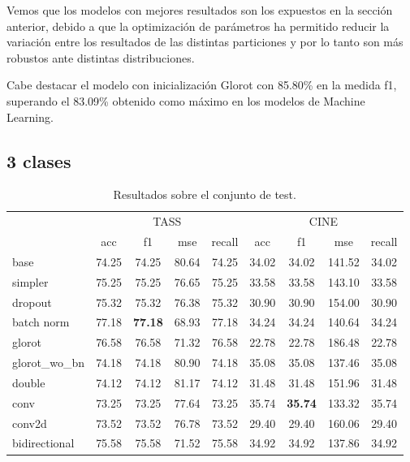 Vemos que los modelos con mejores resultados son los expuestos en la sección anterior, debido a que la optimización de parámetros ha permitido reducir la variación entre los resultados de las distintas particiones y por lo tanto son más robustos ante distintas distribuciones.

Cabe destacar el modelo con inicialización Glorot con 85.80\% en la medida f1, superando el 83.09\% obtenido como máximo en los modelos de Machine Learning.


\subsection{3 clases}

\begin{table}[H]
	\centering
	\begin{tabular}{|l|cccc|cccc|}
		\hline
		& \multicolumn{4}{c|}{TASS} & \multicolumn{4}{c|}{CINE} \\
		\cline{2-9}
		&    acc &     f1 &    mse &  recall & acc &     f1 &    mse &  recall \\
		\hline
		base          &  74.25 &  74.25 &  80.64 &   74.25 &  34.02 &  34.02 &  141.52 &   34.02\\
		simpler       &  75.25 &  75.25 &  76.65 &   75.25 &  33.58 &  33.58 &  143.10 &   33.58\\
		dropout  &  75.32 &  75.32 &  76.38 &   75.32 &  30.90 &  30.90 &  154.00 &   30.90\\
		batch norm    &  77.18 &  \textbf{77.18} &  68.93 &   77.18 &  34.24 &  34.24 &  140.64 &   34.24\\
		glorot        &  76.58 &  76.58 &  71.32 &   76.58 &  22.78 &  22.78 &  186.48 &   22.78 \\
		glorot\_wo\_bn  &  74.18 &  74.18 &  80.90 &   74.18 &  35.08 &  35.08 &  137.46 &   35.08\\
		double        &  74.12 &  74.12 &  81.17 &   74.12 &  31.48 &  31.48 &  151.96 &   31.48\\
		conv          &  73.25 &  73.25 &  77.64 &   73.25 &  35.74 &  \textbf{35.74} &  133.32 &   35.74\\
		conv2d        &  73.52 &  73.52 &  76.78 &   73.52 &  29.40 &  29.40 &  160.06 &   29.40\\
		bidirectional &  75.58 &  75.58 &  71.52 &   75.58 &  34.92 &  34.92 &  137.86 &   34.92\\
		\hline
	\end{tabular}
	\caption{Resultados sobre el conjunto de test.}
	\label{test-dl-3-clases}
\end{table}


